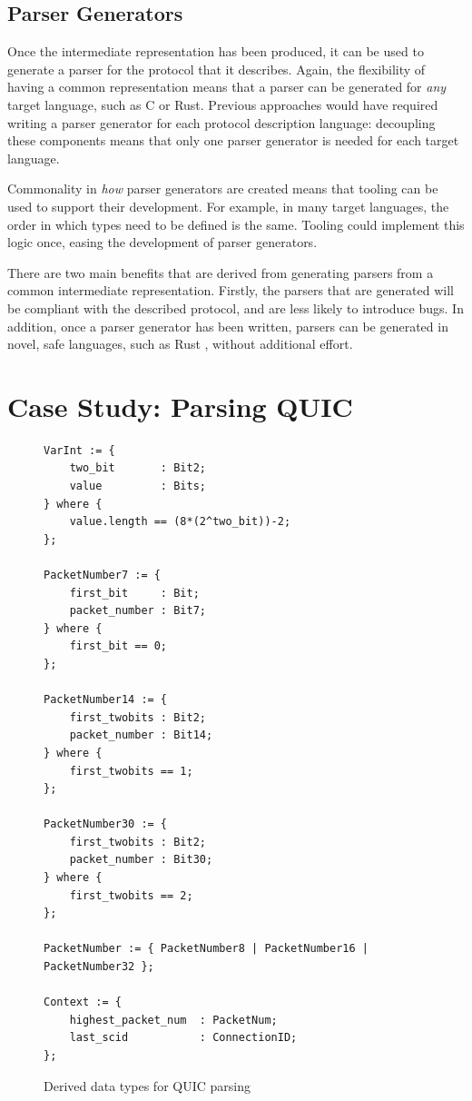 \documentclass[10pt,sigconf]{acmart}
\begin{document}
\subsection{Parser Generators}
\label{sec:npr-output}

Once the intermediate representation has been produced, it can be used to generate a
parser for the protocol that it describes. Again, the flexibility of having a common
representation means that a parser can be generated for \emph{any} target language, such
as C or Rust. Previous approaches would have required writing a parser generator for each
protocol description language: decoupling these components means that only one parser
generator is needed for each target language.

Commonality in \emph{how} parser generators are created means that tooling can be used to
support their development. For example, in many target languages, the order in which types
need to be defined is the same. Tooling could implement this logic once, easing the
development of parser generators.

There are two main benefits that are derived from generating parsers from a common
intermediate representation. Firstly, the parsers that are generated will be compliant
with the described protocol, and are less likely to introduce bugs. In addition, once a
parser generator has been written, parsers can be generated in novel, safe languages, such
as Rust \cite{chifflier2017writing}, without additional effort.

\section{Case Study: Parsing QUIC}
\label{sec:casestudy}

\begin{figure}
	\vspace{3mm}
    \begin{BVerbatim}[fontsize=\scriptsize]
VarInt := {
	two_bit       : Bit2;
	value         : Bits;
} where {
	value.length == (8*(2^two_bit))-2;
};

PacketNumber7 := {
	first_bit     : Bit;
	packet_number : Bit7;
} where {
	first_bit == 0;
};

PacketNumber14 := {
	first_twobits : Bit2;
	packet_number : Bit14;
} where {
	first_twobits == 1;
};

PacketNumber30 := {
	first_twobits : Bit2;
	packet_number : Bit30;
} where {
	first_twobits == 2;
};

PacketNumber := { PacketNumber8 | PacketNumber16 | PacketNumber32 };
                     
Context := {
	highest_packet_num  : PacketNum;
	last_scid           : ConnectionID;
};
    \end{BVerbatim}
    \caption{Derived data types for QUIC parsing}
    \label{fig:quic-base}
\end{figure}
\end{document}
